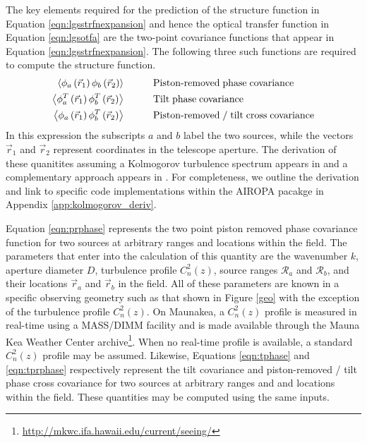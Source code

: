 The key elements required for the prediction of the structure function
in Equation \ref{eqn:lgsstrfnexpansion} and hence the optical transfer
function in Equation \ref{eqn:lgsotfa} are the two-point covariance
functions that appear in Equation \ref{eqn:lgsstrfnexpansion}.  The
following three such functions are required to compute the structure
function.
\begin{align}
\left\langle \phi_{a}\left(\vec{r}_{1}\right) \phi_{b}\left(\vec{r}_{2}\right) \right\rangle &\quad\quad\quad {\rm Piston\text{-}removed\;phase\;covariance} \label{eqn:prphase} \\
\left\langle \phi^{T}_{a}\left(\vec{r}_{1}\right) \phi^{T}_{b}\left(\vec{r}_{2}\right) \right\rangle &\quad\quad\quad {\rm Tilt\;phase\;covariance} \label{eqn:tphase} \\
\left\langle \phi_{a}\left(\vec{r}_{1}\right) \phi^{T}_{b}\left(\vec{r}_{2}\right) \right\rangle &\quad\quad\quad {\rm Piston\text{-}removed\;/\;tilt\;cross\;covariance} \label{eqn:tprphase} 
\end{align}
In this expression the subscripts $a$ and $b$ label the two sources,
while the vectors $\vec{r}_{1}$ and $\vec{r}_{2}$
represent coordinates in the telescope aperture.  
The derivation of these quanitites assuming a Kolmogorov
turbulence spectrum appears in
\cite{Tyler:1994a} and a complementary approach appears in 
\cite{Sasiela:2012}.
For completeness, we outline the derivation and 
link to specific code implementations within the AIROPA
pacakge in Appendix \ref{app:kolmogorov_deriv}. 


Equation \ref{eqn:prphase} represents the two point piston removed
phase covariance function for two sources at arbitrary ranges and
locations within the field.  The parameters that enter into the
calculation of this quantity are the wavenumber $k$, aperture diameter
$D$, turbulence profile $C_{n}^{2}(z)$, source ranges
$\mathcal{R}_{a}$ and $\mathcal{R}_{b}$, and their locations
$\vec{r}_{a}$ and $\vec{r}_{b}$ in the field.  All of
these parameters are known in a specific observing geometry such as
that shown in Figure \ref{geo} with the exception of the turbulence
profile $C_{n}^{2}(z)$.  
On Maunakea, a $C_{n}^{2}(z)$ profile is measured in real-time
using a MASS/DIMM facility and is made available through the Mauna Kea Weather
Center archive\footnote{\url{http://mkwc.ifa.hawaii.edu/current/seeing/}}. 
When no real-time profile is available, 
a standard $C_{n}^{2}(z)$ profile may be assumed.  Likewise,
Equations \ref{eqn:tphase} and \ref{eqn:tprphase} respectively represent
the tilt covariance and piston-removed / tilt phase cross covariance
for two sources at arbitrary ranges and and locations within the
field.  These quantities may be computed using the same inputs.

